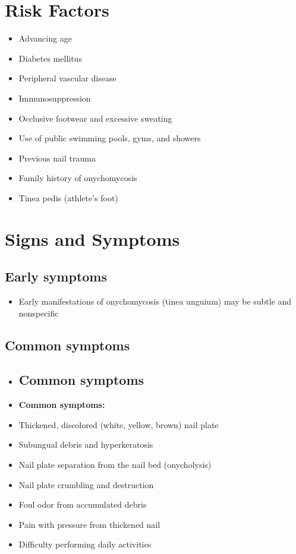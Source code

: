 \section{Risk Factors}

\begin{itemize}[noitemsep]
  \item Advancing age
  \item Diabetes mellitus
  \item Peripheral vascular disease
  \item Immunosuppression
  \item Occlusive footwear and excessive sweating
  \item Use of public swimming pools, gyms, and showers
  \item Previous nail trauma
  \item Family history of onychomycosis
  \item Tinea pedis (athlete's foot)
\end{itemize}

\section{Signs and Symptoms}

\subsection{Early symptoms}
\begin{itemize}[noitemsep]
  \item Early manifestations of onychomycosis (tinea unguium) may be subtle and nonspecific
\end{itemize}

\subsection{Common symptoms}
\begin{itemize}[noitemsep]
  \item \subsection{Common symptoms}
  \item \textbf{Common symptoms:}
  \item Thickened, discolored (white, yellow, brown) nail plate
  \item Subungual debris and hyperkeratosis
  \item Nail plate separation from the nail bed (onycholysis)
  \item Nail plate crumbling and destruction
  \item Foul odor from accumulated debris
  \item Pain with pressure from thickened nail
  \item Difficulty performing daily activities
\end{itemize}

